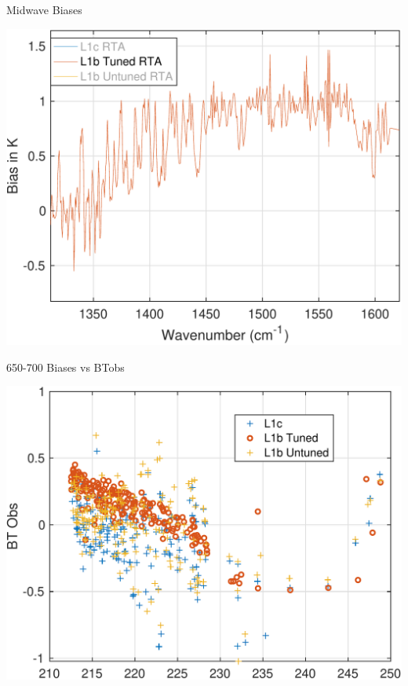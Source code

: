 \documentclass[10pt,t]{beamer}
\begin{document}
\begin{frame}[label={sec:org22ce356},noframenumbering]{Midwave Biases}
\begin{center}
\includegraphics[width=0.75\linewidth]{./Talk2/bias_3rta_mw_justL1btuning.pdf}
\end{center}
\end{frame}

\begin{frame}[label={sec:org047c8ba}]{650-700 \wn Biases vs BTobs}
\begin{center}
\includegraphics[width=0.75\linewidth]{./Talk2/bias_vs_btobs_650-700.pdf}
\end{center}
\end{frame}
\end{document}
